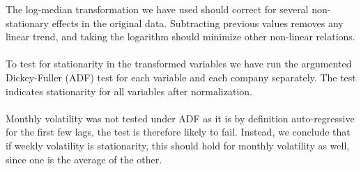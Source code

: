The log-median transformation we have used should correct for several non-stationary effects in the original data. 
Subtracting previous values removes any linear trend, and taking the logarithm should minimize other non-linear relations. 
\\\\
To test for stationarity in the transformed variables we have run the argumented Dickey-Fuller (ADF) test for each variable and each company separately. The test indicates stationarity for all variables after normalization. 
\\\\
Monthly volatility was not tested under ADF as it is by definition auto-regressive for the first few lags, the test is therefore likely to fail. Instead, we conclude that if weekly volatility is stationarity, this should hold for monthly volatility as well, since one is the average of the other.










